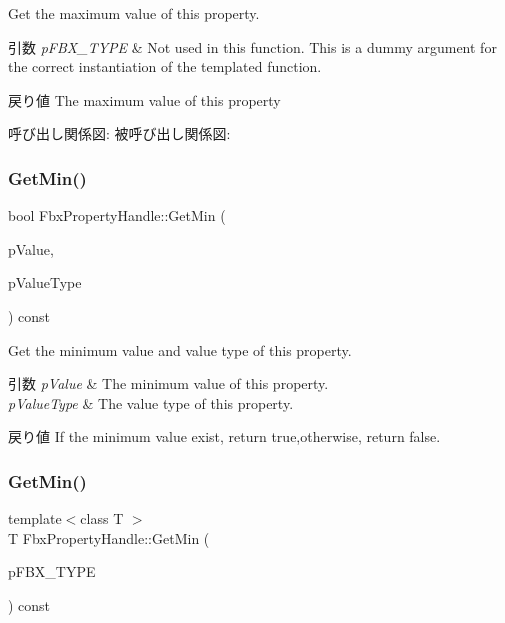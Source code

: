 Get the maximum value of this property. 
\begin{DoxyParams}{引数}
{\em p\+F\+B\+X\+\_\+\+T\+Y\+PE} & Not used in this function. This is a dummy argument for the correct instantiation of the templated function. \\
\hline
\end{DoxyParams}
\begin{DoxyReturn}{戻り値}
The maximum value of this property 
\end{DoxyReturn}
呼び出し関係図\+:
被呼び出し関係図\+:
\mbox{\label{class_fbx_property_handle_a722440b0f9ee5b206e38fe06c375ec4d}} 
\subsubsection{\texorpdfstring{Get\+Min()}{GetMin()}\hspace{0.1cm}{\footnotesize\ttfamily [1/2]}}
{\footnotesize\ttfamily bool Fbx\+Property\+Handle\+::\+Get\+Min (\begin{DoxyParamCaption}\item[{void $\ast$}]{p\+Value,  }\item[{\hyperlink{fbxpropertytypes_8h_a73913a5ddfb20e57c6f25e9e6784bd92}{E\+Fbx\+Type}}]{p\+Value\+Type }\end{DoxyParamCaption}) const}

Get the minimum value and value type of this property. 
\begin{DoxyParams}{引数}
{\em p\+Value} & The minimum value of this property. \\
\hline
{\em p\+Value\+Type} & The value type of this property. \\
\hline
\end{DoxyParams}
\begin{DoxyReturn}{戻り値}
If the minimum value exist, return true,otherwise, return false. 
\end{DoxyReturn}
\mbox{\label{class_fbx_property_handle_a82ce751c67e19e87294a0083f09133c6}} 
\subsubsection{\texorpdfstring{Get\+Min()}{GetMin()}\hspace{0.1cm}{\footnotesize\ttfamily [2/2]}}
{\footnotesize\ttfamily template$<$class T $>$ \\
T Fbx\+Property\+Handle\+::\+Get\+Min (\begin{DoxyParamCaption}\item[{const T $\ast$}]{p\+F\+B\+X\+\_\+\+T\+Y\+PE }\end{DoxyParamCaption}) const}

